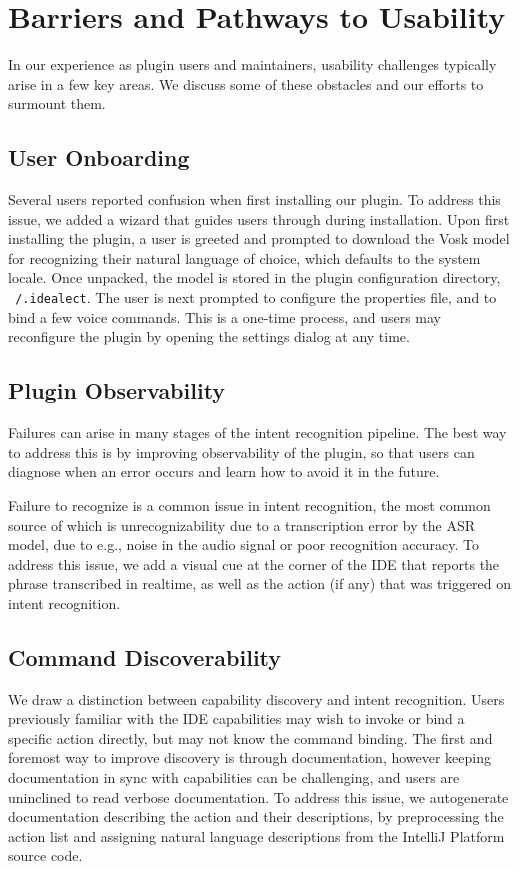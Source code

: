 \documentclass[conference]{IEEEtran}
\begin{document}
\section{Barriers and Pathways to Usability}\label{sec:usability}

In our experience as plugin users and maintainers, usability challenges typically arise in a few key areas. We discuss some of these obstacles and our efforts to surmount them.

\subsection{User Onboarding}

Several users reported confusion when first installing our plugin. To address this issue, we added a wizard that guides users through during installation. Upon first installing the plugin, a user is greeted and prompted to download the Vosk model for recognizing their natural language of choice, which defaults to the system locale. Once unpacked, the model is stored in the plugin configuration directory, \texttt{~/.idealect}. The user is next prompted to configure the properties file, and to bind a few voice commands. This is a one-time process, and users may reconfigure the plugin by opening the settings dialog at any time.

\subsection{Plugin Observability}

Failures can arise in many stages of the intent recognition pipeline. The best way to address this is by improving observability of the plugin, so that users can diagnose when an error occurs and learn how to avoid it in the future.

Failure to recognize is a common issue in intent recognition, the most common source of which is unrecognizability due to a transcription error by the ASR model, due to e.g., noise in the audio signal or poor recognition accuracy. To address this issue, we add a visual cue at the corner of the IDE that reports the phrase transcribed in realtime, as well as the action (if any) that was triggered on intent recognition.

\subsection{Command Discoverability}

We draw a distinction between capability discovery and intent recognition. Users previously familiar with the IDE capabilities may wish to invoke or bind a specific action directly, but may not know the command binding. The first and foremost way to improve discovery is through documentation, however keeping documentation in sync with capabilities can be challenging, and users are uninclined to read verbose documentation. To address this issue, we autogenerate documentation describing the action and their descriptions, by preprocessing the action list and assigning natural language descriptions from the IntelliJ Platform source code.
\end{document}
